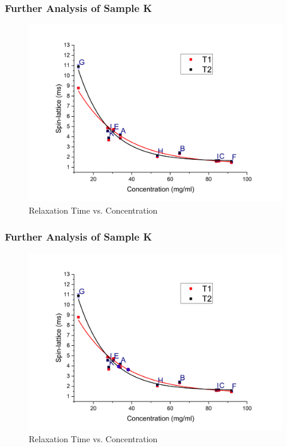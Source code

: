 \begin{frame}
    \frametitle{Further Analysis of Sample K}
    \begin{figure}[htbp!]
        \begin{center}
            \includegraphics[width=0.8\linewidth]{./images/figures/conc_spin.jpg}
        \end{center}
                \caption{Relaxation Time vs. Concentration}
        \label{fig:conc-spin}
    \end{figure}
\end{frame}

\begin{frame}
        \frametitle{Further Analysis of Sample K}
        \begin{figure}[htbp!]
            \begin{center}
                \includegraphics[width=0.8\linewidth]{./images/figures/conc_spin_k_t1t2.jpg}
            \end{center}
                    \caption{Relaxation Time vs. Concentration}
            \label{fig:conc-spin}
        \end{figure}
    \end{frame}